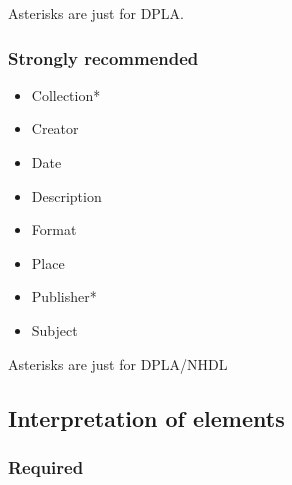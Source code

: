 \documentclass[11pt]{article}
\begin{document}
Asterisks are just for DPLA.

\subsubsection*{Strongly recommended}
\label{sec:org4e0fb17}
\begin{itemize}
\item Collection*
\item Creator
\item Date
\item Description
\item Format
\item Place
\item Publisher*
\item Subject
\end{itemize}

Asterisks are just for DPLA/NHDL

\subsection*{Interpretation of elements}
\label{sec:orgd8fec1f}
\subsubsection*{Required}
\label{sec:org5284249}
\end{document}
